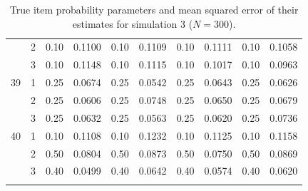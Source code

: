\begin{longtable}{llcccccccc}
   & 2 & 0.10 & 0.1100 & 0.10 & 0.1109 & 0.10 & 0.1111 & 0.10 & 0.1058 \\ 
   & 3 & 0.10 & 0.1148 & 0.10 & 0.1115 & 0.10 & 0.1017 & 0.10 & 0.0963 \\ 
  39 & 1 & 0.25 & 0.0674 & 0.25 & 0.0542 & 0.25 & 0.0643 & 0.25 & 0.0626 \\ 
   & 2 & 0.25 & 0.0606 & 0.25 & 0.0748 & 0.25 & 0.0650 & 0.25 & 0.0679 \\ 
   & 3 & 0.25 & 0.0632 & 0.25 & 0.0563 & 0.25 & 0.0620 & 0.25 & 0.0736 \\ 
  40 & 1 & 0.10 & 0.1108 & 0.10 & 0.1232 & 0.10 & 0.1125 & 0.10 & 0.1158 \\ 
   & 2 & 0.50 & 0.0804 & 0.50 & 0.0873 & 0.50 & 0.0750 & 0.50 & 0.0869 \\ 
   & 3 & 0.40 & 0.0499 & 0.40 & 0.0642 & 0.40 & 0.0574 & 0.40 & 0.0620 \\ 
   \bottomrule
\caption{True item probability parameters and mean squared error of their estimates for simulation 3 ($N = 300$).} 
\label{table:sim3_item_prob_mse_N300}
\end{longtable}
